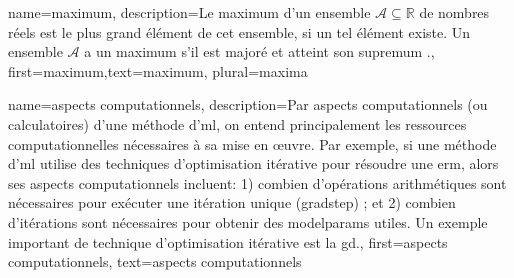 {
	name=maximum,
	description={Le maximum d’un ensemble $\mathcal{A} \subseteq \mathbb{R}$ de nombres réels est le plus grand élément de cet ensemble, si un tel élément existe. Un ensemble $\mathcal{A}$ a un maximum s’il est majoré et atteint son \gls{supremum} \cite[Sec.~1.4]{RudinBookPrinciplesMatheAnalysis}.},
	first={maximum},text={maximum}, plural={maxima}
}

{
	name={aspects computationnels},
	description={Par aspects computationnels (ou calculatoires) d’une méthode d'\gls{ml}, on entend principalement les ressources computationnelles nécessaires à sa mise en œuvre. Par exemple, si une méthode d'\gls{ml} utilise des techniques d’optimisation itérative pour résoudre une \gls{erm}, alors ses aspects computationnels incluent: 1) combien d’opérations arithmétiques sont nécessaires pour exécuter une itération unique (\gls{gradstep}) ; et 2) combien d’itérations sont nécessaires pour obtenir des \gls{modelparams} utiles. Un exemple important de technique d’optimisation itérative est la \gls{gd}.},
	first={aspects computationnels},
	text={aspects computationnels}
}

